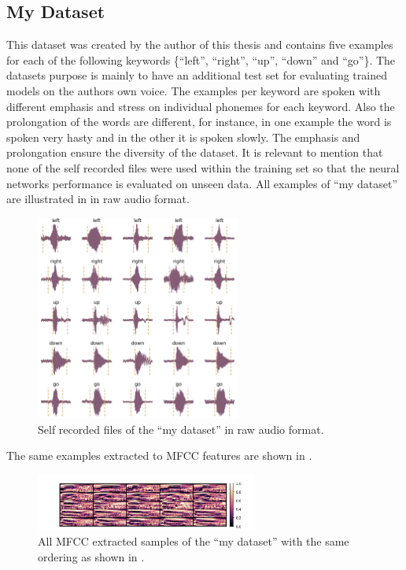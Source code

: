 \FloatBarrier
\noindent



\subsection{My Dataset}\label{sec:exp_dataset_my}
This dataset was created by the author of this thesis and contains five examples for each of the following keywords \{\enquote{left}, \enquote{right}, \enquote{up}, \enquote{down} and \enquote{go}\}.
The datasets purpose is mainly to have an additional test set for evaluating trained models on the authors own voice.
The examples per keyword are spoken with different emphasis and stress on individual phonemes for each keyword.
Also the prolongation of the words are different, for instance, in one example the word is spoken very hasty and in the other it is spoken slowly.
The emphasis and prolongation ensure the diversity of the dataset.
It is relevant to mention that none of the self recorded files were used within the training set so that the neural networks performance is evaluated on unseen data.
All examples of \enquote{my dataset} are illustrated in  in raw audio format.
\begin{figure}[!ht]
  \centering
    \includegraphics[width=0.6\textwidth]{./5_exp/figs/exp_dataset_my_wav_grid.png}
  \caption{Self recorded files of the \enquote{my dataset} in raw audio format.}
  \label{fig:exp_dataset_my_wav_grid}
\end{figure}
\FloatBarrier
\noindent
The same examples extracted to MFCC features are shown in .
\begin{figure}[!ht]
  \centering
    \includegraphics[width=0.65\textwidth]{./5_exp/figs/exp_dataset_my_mfcc.png}
  \caption{All MFCC extracted samples of the \enquote{my dataset} with the same ordering as shown in .}
  \label{fig:exp_dataset_my_mfcc}
\end{figure}
